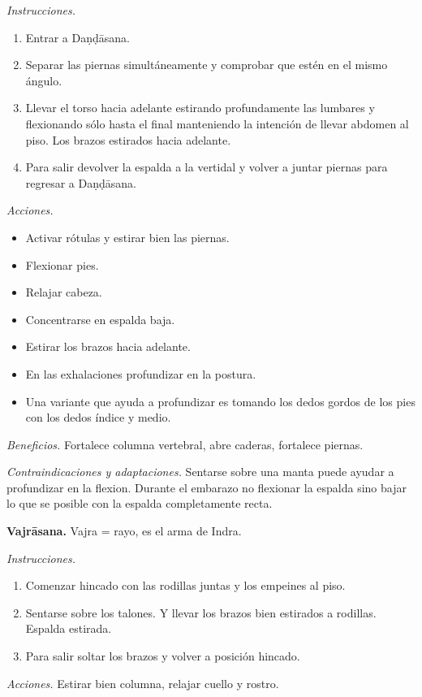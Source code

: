 \emph{Instrucciones.}
\begin{enumerate}
\item Entrar a Daṇḍāsana.
\item Separar las piernas simultáneamente y
comprobar que estén en el mismo ángulo.
\item Llevar el torso hacia adelante
estirando profundamente las lumbares y
flexionando sólo hasta el final manteniendo
la intención de llevar abdomen al piso. Los
brazos estirados hacia adelante.
\item Para salir devolver la espalda a la
vertidal y volver a juntar piernas para
regresar a Daṇḍāsana.
\end{enumerate}

\emph{Acciones.}
\begin{itemize}
\item Activar rótulas y estirar bien las
piernas.
\item Flexionar pies.
\item Relajar cabeza.
\item Concentrarse en espalda baja.
\item Estirar los brazos hacia adelante.
\item En las exhalaciones profundizar en la
postura.
\item Una variante que ayuda a profundizar es
tomando los dedos gordos de los pies con los
dedos índice y medio.
\end{itemize}

\emph{Beneficios.} Fortalece columna
vertebral, abre caderas, fortalece piernas.

\emph{Contraindicaciones y adaptaciones.}
Sentarse sobre una manta puede ayudar a
profundizar en la flexion. Durante el
embarazo no flexionar la espalda sino bajar
lo que se posible con la espalda
completamente recta.

\medskip\noindent\textbf{Vajrāsana.}
Vajra = rayo, es el arma de Indra.

\emph{Instrucciones.}
\begin{enumerate}
\item Comenzar hincado con las rodillas
juntas y los empeines al piso.
\item Sentarse sobre los talones. Y llevar
los brazos bien estirados a rodillas. Espalda
estirada.
\item Para salir soltar los brazos y volver a
posición hincado.
\end{enumerate}

\emph{Acciones.} Estirar bien columna,
relajar cuello y rostro.

